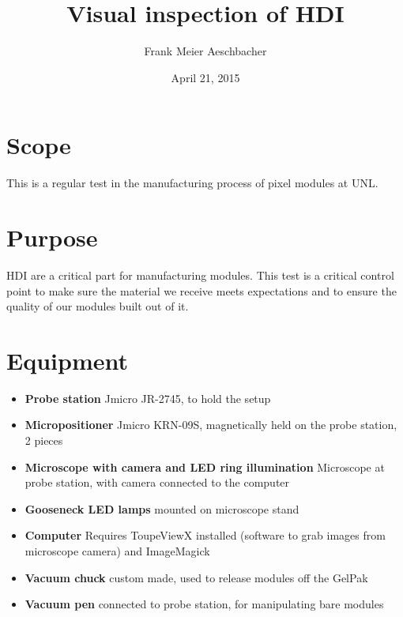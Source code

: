\documentclass[12pt]{unlsilabsop}
\title{Visual inspection of HDI}
\date{April 21, 2015}
\author{Frank Meier Aeschbacher}
\begin{document}
\maketitle

\section{Scope}
This is a regular test in the manufacturing process of pixel modules at UNL.

\section{Purpose}
HDI are a critical part for manufacturing modules. This test is a critical control point to make sure the material we receive meets expectations and to ensure the quality of our modules built out of it.



\section{Equipment}

\begin{itemize}
\item \textbf{Probe station} Jmicro JR-2745, to hold the setup
\item \textbf{Micropositioner} Jmicro KRN-09S, magnetically held on the probe station, 2 pieces
\item \textbf{Microscope with camera and LED ring illumination} Microscope at probe station, with camera connected to the computer
\item \textbf{Gooseneck LED lamps} mounted on microscope stand
\item \textbf{Computer} Requires ToupeViewX installed (software to grab images from microscope camera) and ImageMagick
\item \textbf{Vacuum chuck} custom made, used to release modules off the GelPak
\item \textbf{Vacuum pen} connected to probe station, for manipulating bare modules
\end{itemize}
\end{document}
